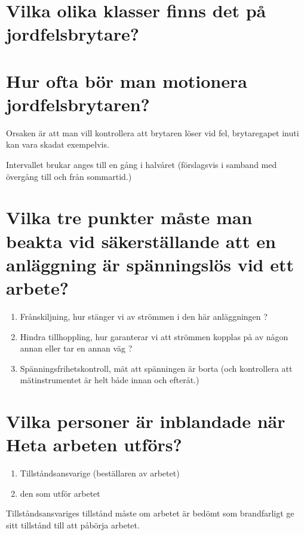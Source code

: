\documentclass[a4paper,swedish]{article}
\begin{document}
\setcounter{section}{33}
\section{Vilka olika klasser finns det på jordfelsbrytare?}\label{sec:RCD_klasser}

\setcounter{section}{35}
\section{Hur ofta bör man motionera jordfelsbrytaren?}\label{sec:motionering_RCD}

Orsaken är att man vill kontrollera att brytaren löser vid fel, brytaregapet inuti kan vara skadat exempelvis.

Intervallet brukar anges till en gång i halvåret (förslagsvis i samband med övergång till och från sommartid.)

\setcounter{section}{37}
\section{Vilka tre punkter måste man beakta vid säkerställande att en anläggning är
  spänningslös vid ett arbete?}

\begin{enumerate}
\item Frånskiljning, hur stänger vi av strömmen i den här anläggningen ?
\item Hindra tillhoppling, hur garanterar vi att strömmen kopplas på av någon annan eller tar en annan väg ?
\item Spänningsfrihetskontroll, mät att spänningen är borta (och kontrollera att mätinstrumentet är helt både innan och efteråt.)
\end{enumerate}

\setcounter{section}{39}
\section{Vilka personer är inblandade när Heta arbeten utförs?}\label{sec:heta_arbeten_roller}

\begin{enumerate}
\item Tillståndsansvarige (beställaren av arbetet)
\item den som utför arbetet
\end{enumerate}

Tillståndsansvariges tillstånd måste om arbetet är bedömt som brandfarligt ge sitt tillstånd till att påbörja arbetet.
\end{document}

